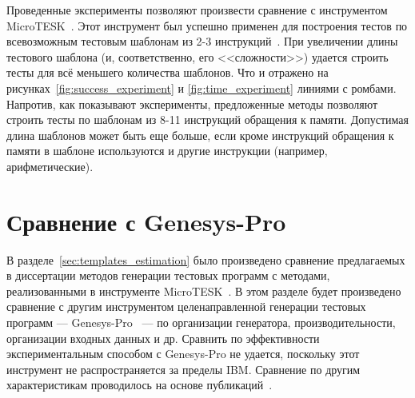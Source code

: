 Проведенные эксперименты позволяют произвести сравнение с инструментом
MicroTESK~\cite{MicroTESK}. Этот инструмент был успешно применен для построения
тестов по всевозможным тестовым шаблонам из 2-3 инструкций~\cite{vorobyev}. При
увеличении длины тестового шаблона (и, соответственно, его <<сложности>>) удается
строить тесты для всё меньшего количества шаблонов. Что и отражено на
рисунках~\ref{fig:success_experiment} и \ref{fig:time_experiment} линиями с
ромбами. Напротив, как показывают эксперименты, предложенные методы позволяют
строить тесты по шаблонам из 8-11 инструкций обращения к памяти. Допустимая
длина шаблонов может быть еще больше, если кроме инструкций обращения к памяти в
шаблоне используются и другие инструкции (например, арифметические).

\section{Сравнение с Genesys-Pro}

В разделе~\ref{sec:templates_estimation} было произведено сравнение предлагаемых в диссертации методов генерации тестовых программ с методами, реализованными в инструменте
MicroTESK~\cite{MicroTESK}. В этом разделе будет произведено сравнение с другим
инструментом целенаправленной генерации тестовых программ --- Genesys-Pro~\cite{GenesysPro} --- по организации генератора, производительности, организации входных данных и др. Сравнить
по эффективности экспериментальным способом с Genesys-Pro не удается, поскольку этот инструмент не распространяется за пределы IBM. Сравнение по другим характеристикам проводилось на основе  публикаций~\cite{GenesysPro2004Innovations, GenesysSolver}.


